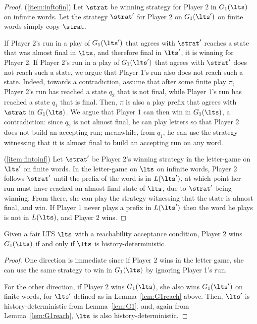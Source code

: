 \begin{proof}
(\ref{item:inftofin}) Let $\strat$ be winning strategy for Player 2 in $G_1(\lts)$ on infinite words. Let the strategy $\strat'$ for Player 2 on $G_1(\lts')$ on finite words simply copy $\strat$.

If Player 2's run in a play of $G_1(\lts')$ that agrees with $\strat'$ reaches a state that was almost final in $\lts$, and therefore final in $\lts'$, it is winning for Player 2. If Player 2's run in a play of $G_1(\lts')$ that agrees with $\strat'$ does not reach such a state, we argue that Player 1's run also does not reach such a state. Indeed, towards a contradiction, assume that after some finite play $\pi$, Player 2's run has reached a state $q_2$ that is not final, while Player 1's run has reached a state $q_1$ that is final. Then, $\pi$ is also a play prefix that agrees with $\strat$ in $G_1(\lts)$. We argue that Player 1 can then win in $G_1(\lts)$, a contradiction: since $q_2$ is not almost final, he can play letters so that Player 2 does not build an accepting run; meanwhile, from $q_1$, he can use the strategy witnessing that it is almost final to build an accepting run on any word.

(\ref{item:fintoinf}) Let $\strat'$ be Player 2's winning strategy in the letter-game on $\lts'$ on finite words. In the letter-game on $\lts$ on infinite words, Player 2 follows $\strat'$ until the prefix of the word is in $L(\lts')$, at which point her run must have reached an almost final state of $\lts$, due to $\strat'$ being winning. From there, she can play the strategy witnessing that the state is almost final, and win.
If Player 1 never plays a prefix in $L(\lts')$ then the word he plays is not in $L(\lts)$, and Player 2 wins.
\end{proof}

\begin{theorem}
Given a fair LTS $\lts$ with a reachability acceptance condition, Player 2 wins $G_1(\lts)$ if and only if $\lts$ is history-deterministic. 
\end{theorem}

\begin{proof}
One direction is immediate since if Player 2 wins in the letter game, she can use the same strategy to win in $G_1(\lts)$ by ignoring Player 1's run.

For the other direction, if Player 2 wins $G_1(\lts)$, she also wins $G_1(\lts')$ on finite words, for $\lts'$ defined as in Lemma~\ref{lem:G1reach} above. Then, $\lts'$ is history-deterministic from Lemma~\ref{lem:G1}, and, again from Lemma~\ref{lem:G1reach}, $\lts$ is also history-deterministic.
\end{proof}


